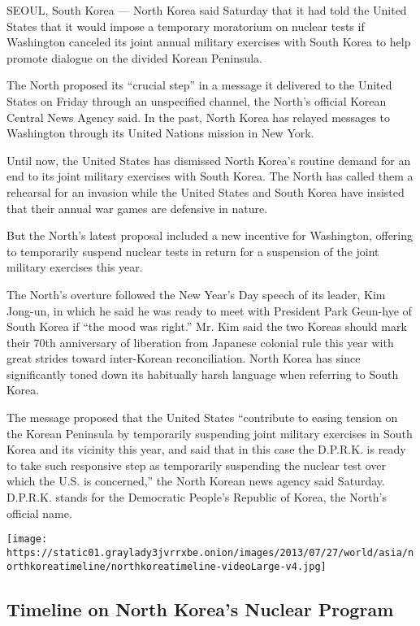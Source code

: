 SEOUL, South Korea --- North Korea said Saturday that it had told the
United States that it would impose a temporary moratorium on nuclear
tests if Washington canceled its joint annual military exercises with
South Korea to help promote dialogue on the divided Korean Peninsula.

The North proposed its ``crucial step'' in a message it delivered to the
United States on Friday through an unspecified channel, the North's
official Korean Central News Agency said. In the past, North Korea has
relayed messages to Washington through its United Nations mission in New
York.

Until now, the United States has dismissed North Korea's routine demand
for an end to its joint military exercises with South Korea. The North
has called them a rehearsal for an invasion while the United States and
South Korea have insisted that their annual war games are defensive in
nature.

But the North's latest proposal included a new incentive for Washington,
offering to temporarily suspend nuclear tests in return for a suspension
of the joint military exercises this year.

The North's overture followed the New Year's Day speech of its leader,
Kim Jong-un, in which he said he was ready to meet with President Park
Geun-hye of South Korea if ``the mood was right.'' Mr. Kim said the two
Koreas should mark their 70th anniversary of liberation from Japanese
colonial rule this year with great strides toward inter-Korean
reconciliation. North Korea has since significantly toned down its
habitually harsh language when referring to South Korea.

The message proposed that the United States ``contribute to easing
tension on the Korean Peninsula by temporarily suspending joint military
exercises in South Korea and its vicinity this year, and said that in
this case the D.P.R.K. is ready to take such responsive step as
temporarily suspending the nuclear test over which the U.S. is
concerned,'' the North Korean news agency said Saturday. D.P.R.K. stands
for the Democratic People's Republic of Korea, the North's official
name.

\href{https://www.nytimes3xbfgragh.onion/interactive/2014/11/20/world/asia/northkorea-timeline.html}{}

\texttt{[image: https://static01.graylady3jvrrxbe.onion/images/2013/07/27/world/asia/northkoreatimeline/northkoreatimeline-videoLarge-v4.jpg]}

\hypertarget{timeline-on-north-koreas-nuclear-program}{%
\subsection{Timeline on North Korea's Nuclear
Program}\label{timeline-on-north-koreas-nuclear-program}}

